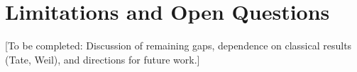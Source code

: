 \section{Limitations and Open Questions}

[To be completed: Discussion of remaining gaps, dependence on classical results (Tate, Weil), and directions for future work.]
